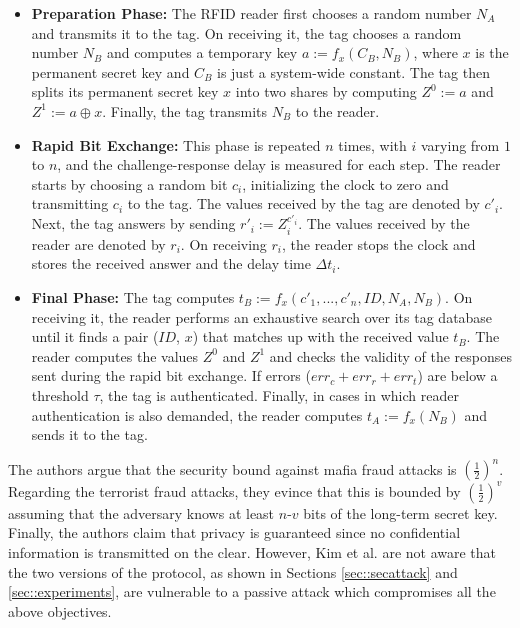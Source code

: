 \documentclass{article}
\newcommand \thr {\tau}
\begin{document}
\begin{itemize}
\item \textbf{Preparation Phase:} The RFID reader first chooses a random number $N_A$ and transmits it to the tag. On receiving it, the tag chooses a random number $N_B$ and computes a temporary key $a:=f_x(C_B, N_B)$, where $x$ is the permanent secret key and $C_B$ is just a system-wide constant. The tag then splits its permanent secret key $x$ into two shares by computing $Z^0:=a$ and $Z^1:= a \oplus x$. Finally, the tag transmits $N_B$ to the reader.

\item\textbf{ Rapid Bit Exchange:} This phase is repeated $n$ times, with $i$ varying from $1$ to $n$, and the challenge-response delay is measured for each step.  The reader starts by choosing a random bit $c_i$, initializing the clock to zero and transmitting $c_i$ to the tag. The values received by the tag are denoted by $c'_i$.  Next, the tag answers by sending $r'_i:=Z_i^{c'_i}$. The values received by the reader are denoted by $r_i$.  On receiving $r_i$, the reader stops the clock and stores the received answer and the delay time $\Delta t_i$.

\item \textbf{Final Phase:} The tag computes $t_B := f_x(c'_1, ... , c'_n, ID, N_A, N_B)$. On receiving it, the reader performs an exhaustive search over its tag database until it finds a pair ($ID$, $x$) that matches up with the received value $t_B$. The reader computes the values $Z^0$ and $Z^1$ and checks the validity of the responses sent during the rapid bit exchange.  If errors ($err_c+err_r+err_t$) are below a threshold $\thr$, the tag is authenticated. Finally, in cases in which reader authentication is also demanded, the reader computes $t_A:=f_x(N_B)$ and sends it to the tag.
\end{itemize}


The authors argue that the security bound against mafia fraud attacks is $(\frac{1}{2})^n$. Regarding the terrorist fraud attacks, they evince that this is bounded by  $(\frac{1}{2})^v$ assuming that the adversary knows at least $n$-$v$ bits of the long-term secret key. Finally, the authors claim that privacy is guaranteed since no confidential information is transmitted on the clear. However, Kim et al. are not aware that the two versions of the protocol, as shown in Sections \ref{sec::secattack} and \ref{sec::experiments}, are vulnerable to a passive attack which compromises all the above objectives.
\end{document}
